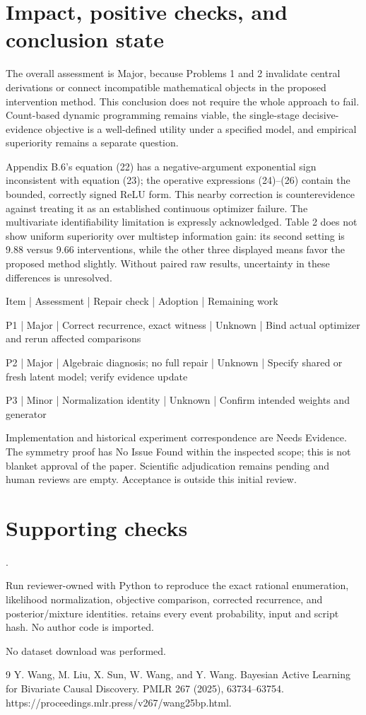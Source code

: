 \documentclass[10pt]{article}
\begin{document}
\section*{Impact, positive checks, and conclusion state}
The overall assessment is Major, because Problems 1 and 2 invalidate central derivations or connect incompatible mathematical objects in the proposed intervention method. This conclusion does not require the whole approach to fail. Count-based dynamic programming remains viable, the single-stage decisive-evidence objective is a well-defined utility under a specified model, and empirical superiority remains a separate question.\par
Appendix B.6’s equation (22) has a negative-argument exponential sign inconsistent with equation (23); the operative expressions (24)–(26) contain the bounded, correctly signed ReLU form. This nearby correction is counterevidence against treating it as an established continuous optimizer failure. The multivariate identifiability limitation is expressly acknowledged. Table 2 does not show uniform superiority over multistep information gain: its second setting is 9.88 versus 9.66 interventions, while the other three displayed means favor the proposed method slightly. Without paired raw results, uncertainty in these differences is unresolved.\par
Item | Assessment | Repair check | Adoption | Remaining work\par
P1 | Major | Correct recurrence, exact witness | Unknown | Bind actual optimizer and rerun affected comparisons\par
P2 | Major | Algebraic diagnosis; no full repair | Unknown | Specify shared or fresh latent model; verify evidence update\par
P3 | Minor | Normalization identity | Unknown | Confirm intended weights and generator\par
Implementation and historical experiment correspondence are Needs Evidence. The symmetry proof has No Issue Found within the inspected scope; this is not blanket approval of the paper. Scientific adjudication remains pending and human reviews are empty. Acceptance is outside this initial review.\par
\section*{Supporting checks}
.\par
Run reviewer-owned with Python to reproduce the exact rational enumeration, likelihood normalization, objective comparison, corrected recurrence, and posterior/mixture identities. retains every event probability, input and script hash. No author code is imported.\par
No dataset download was performed.\par
9 Y. Wang, M. Liu, X. Sun, W. Wang, and Y. Wang. Bayesian Active Learning for Bivariate Causal Discovery. PMLR 267 (2025), 63734–63754. https://proceedings.mlr.press/v267/wang25bp.html.\par
\end{document}
